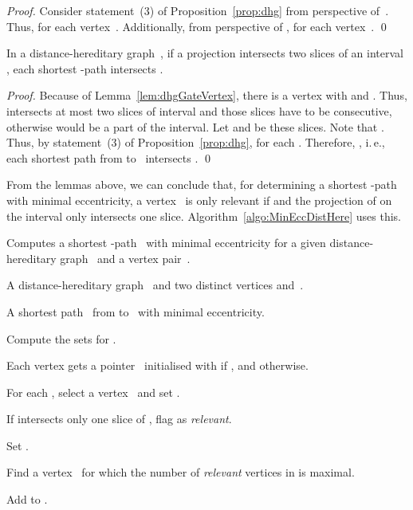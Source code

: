 \documentclass[10pt]{llncs}
\makeatletter
\newcommand{\ie}{i.\,e.\@ifnextchar{,}{}{~}}
\makeatother
\begin{document}
\begin{proof}
Consider statement~(3) of Proposition~\ref{prop:dhg} from perspective of~.
Thus,  for each vertex~. 
Additionally, from perspective of ,  for each vertex~.
\qed
\end{proof}

\begin{lemma}
    \label{lem:dhgProjSliceInter}
In a distance-hereditary graph~, if a projection  intersects two slices of an interval , each shortest -path intersects .
\end{lemma}

\begin{proof}
Because of Lemma~\ref{lem:dhgGateVertex}, there is a vertex  with  and . 
Thus,  intersects at most two slices of interval  and those slices have to be consecutive, otherwise  would be a part of the interval.
Let  and  be these slices. 
Note that . 
Thus, by statement~(3) of Proposition~\ref{prop:dhg},  for each . 
Therefore, , \ie, each shortest path from  to~ intersects .
\qed
\end{proof}

From the lemmas above, we can conclude that, for determining a shortest -path with minimal eccentricity, a vertex~ is only relevant if  and the projection of  on the interval  only intersects one slice.
Algorithm~\ref{algo:MinEccDistHere} uses this.

\begin{algorithm}
    [htb]
    \caption
    {
        \label{algo:MinEccDistHere}
        Computes a shortest -path~ with minimal eccentricity for a given distance-hereditary graph~ and a vertex pair~.
    }

\KwIn
{
    A distance-hereditary graph~ and two distinct vertices  and~.
}

\KwOut
{
    A shortest path~ from  to~ with minimal eccentricity.
}

Compute the sets  for .

Each vertex  gets a pointer~ initialised with  if , and  otherwise.

\For
{
     \KwTo 
    \label{line:dhgFindGateLoop}
}
{
    For each , select a vertex~ and set .
    \label{line:dhgFindGateIteration}
}

\ForEach
{
    
}
{
    If  intersects only one slice of , flag  as \emph{relevant}. 
    \label{line:dhgFlagRelevant}
}

Set .

\For
{
     \KwTo 
    \label{line:dhgSelectPLoop}
}
{
    Find a vertex~ for which the number of \emph{relevant} vertices in  is maximal.

    Add  to .
    \label{line:dhgSelectPAddV}
}

\end{algorithm}
\end{document}
